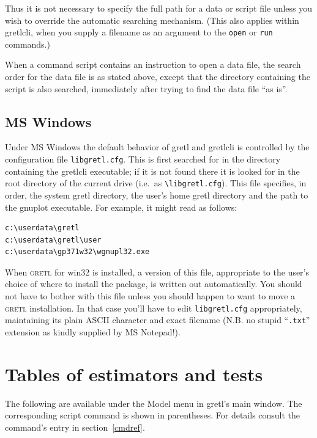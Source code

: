 \documentclass{article}
\begin{document}
Thus it is not necessary to specify the full path for a data or script
file unless you wish to override the automatic searching mechanism.
(This also applies within \textsf{gretlcli}, when you supply a filename
as an argument to the \texttt{open} or \texttt{run} commands.)

When a command script contains an instruction to open a data file, the
search order for the data file is as stated above, except that the
directory containing the script is also searched, immediately after
trying to find the data file ``as is''.

\subsection{MS Windows}

Under MS Windows the default behavior of \textsf{gretl} and
\textsf{gretlcli} is controlled by the configuration file
\texttt{libgretl.cfg}.  This is first searched for in the directory
containing the \textsf{gretlcli} executable; if it is not found there
it is looked for in the root directory of the current drive (i.e.\ as
\verb+\libgretl.cfg+).  This file specifies, in order, the system
gretl directory, the user's home gretl directory and the path to the
gnuplot executable.  For example, it might read as follows:

\begin{verbatim}
c:\userdata\gretl
c:\userdata\gretl\user
c:\userdata\gp371w32\wgnupl32.exe
\end{verbatim}

When \textsc{gretl} for win32 is installed, a version of this file,
appropriate to the user's choice of where to install the package, is
written out automatically.  You should not have to bother with this
file unless you should happen to want to move a \textsc{gretl}
installation.  In that case you'll have to edit \texttt{libgretl.cfg}
appropriately, maintaining its plain ASCII character and exact
filename (N.B. no stupid ``\texttt{.txt}'' extension as kindly
supplied by MS Notepad!).

\clearpage

\section{Tables of estimators and tests}
\label{estim}

The following are available under the Model menu in \textsf{gretl}'s
main window.  The corresponding script command is shown in
parentheses.  For details consult the command's entry in
section~\ref{cmdref}.
\end{document}
